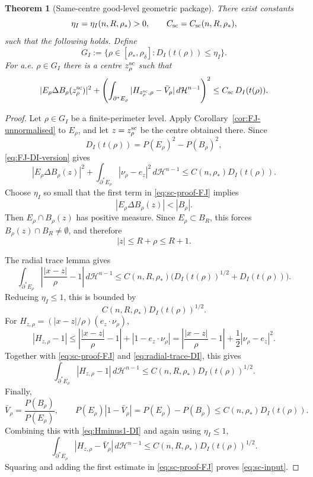 \documentclass[11pt]{amsart}
\newtheorem{theorem}{Theorem}[section]
\theoremstyle{definition}
\newcommand{\rstar}{\rho_*}
\newcommand{\rdel}{\rho_\delta}
\newcommand{\Hn}{\mathcal H^{n-1}}
\newcommand{\Per}{P}
\begin{document}
\begin{theorem}[Same-centre good-level geometric package]\label{inp:samecenter}
There exist constants
\[
   \eta_I=\eta_I(n,R,\rstar)>0,\qquad
   C_{\rm sc}=C_{\rm sc}(n,R,\rstar),
\]
such that the following holds.  Define
\[
   G_I:=\{\rho\in[\rstar,\rdel]:D_I(t(\rho))\le\eta_I\}.
\]
For a.e. \(\rho\in G_I\) there is a centre \(z_\rho^{\rm sc}\) such that
\begin{equation}\label{eq:sc-input}
   |E_\rho\Delta B_\rho(z_\rho^{\rm sc})|^2
   +
   \left(
      \int_{\partial^*E_\rho}
         |H_{z_\rho^{\rm sc},\rho}-\bar V_\rho|\,d\Hn
   \right)^2
   \le C_{\rm sc}\,D_I(t(\rho)).
\end{equation}
\end{theorem}

\begin{proof}
Let \(\rho\in G_I\) be a finite-perimeter level.  Apply
Corollary~\ref{cor:FJ-unnormalised} to \(E_\rho\), and let
\(z=z_\rho^{\rm sc}\) be the centre obtained there.  Since
\[
   D_I(t(\rho))=\Per(E_\rho)^2-\Per(B_\rho)^2,
\]
\eqref{eq:FJ-DI-version} gives
\begin{equation}\label{eq:sc-proof-FJ}
   |E_\rho\Delta B_\rho(z)|^2
   +
   \int_{\partial^*E_\rho}|\nu_\rho-e_z|^2\,d\Hn
   \le C(n,\rstar)D_I(t(\rho)).
\end{equation}
Choose \(\eta_I\) so small that the first term in
\eqref{eq:sc-proof-FJ} implies
\[
   |E_\rho\Delta B_\rho(z)|<|B_\rho|.
\]
Then \(E_\rho\cap B_\rho(z)\) has positive measure.  Since
\(E_\rho\subset B_R\), this forces \(B_\rho(z)\cap B_R\ne\emptyset\), and
therefore
\begin{equation}\label{eq:sc-centre-localised}
   |z|\le R+\rho\le R+1 .
\end{equation}

The radial trace lemma gives
\[
   \int_{\partial^*E_\rho}
      \left|\frac{|x-z|}{\rho}-1\right|\,d\Hn
   \le
   C(n,R,\rstar)
   \bigl(D_I(t(\rho))^{1/2}+D_I(t(\rho))\bigr).
\]
Reducing \(\eta_I\le1\), this is bounded by
\begin{equation}\label{eq:radial-trace-DI}
   C(n,R,\rstar)D_I(t(\rho))^{1/2}.
\end{equation}
For \(H_{z,\rho}=(|x-z|/\rho)(e_z\cdot\nu_\rho)\),
\[
   |H_{z,\rho}-1|
   \le
   \left|\frac{|x-z|}{\rho}-1\right|
   +
   |1-e_z\cdot\nu_\rho|
   =
   \left|\frac{|x-z|}{\rho}-1\right|
   +
   \frac12|\nu_\rho-e_z|^2 .
\]
Together with \eqref{eq:sc-proof-FJ} and \eqref{eq:radial-trace-DI},
this gives
\begin{equation}\label{eq:Hminus1-DI}
   \int_{\partial^*E_\rho}|H_{z,\rho}-1|\,d\Hn
   \le C(n,R,\rstar)D_I(t(\rho))^{1/2}.
\end{equation}
Finally,
\[
   \bar V_\rho=\frac{\Per(B_\rho)}{\Per(E_\rho)},\qquad
   \Per(E_\rho)|1-\bar V_\rho|
   =
   \Per(E_\rho)-\Per(B_\rho)
   \le C(n,\rstar)D_I(t(\rho)).
\]
Combining this with \eqref{eq:Hminus1-DI} and again using
\(\eta_I\le1\),
\[
   \int_{\partial^*E_\rho}|H_{z,\rho}-\bar V_\rho|\,d\Hn
   \le C(n,R,\rstar)D_I(t(\rho))^{1/2}.
\]
Squaring and adding the first estimate in \eqref{eq:sc-proof-FJ} proves
\eqref{eq:sc-input}.
\end{proof}
\end{document}
